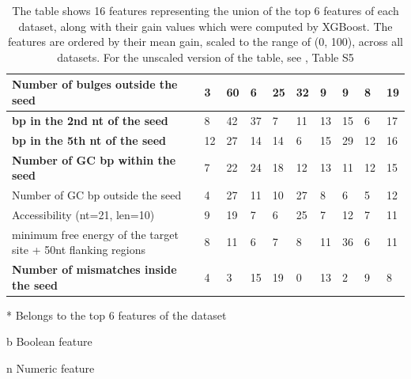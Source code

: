 \documentclass{bmcart}
\begin{document}
\begin{backmatter}
\begin{table}[h!]
\begin{threeparttable}
{\begin{tabular}{|l|l|l|l|l|l|l|l|l|l|}
Number of bulges outside the seed\tnote{n}                 & 3            & 60\tnote{*}           & 6            & 25\tnote{*}          & 32\tnote{*}          & 9           & 9           & 8           & 19            \\ \hline
\textbf{bp in the 2nd nt of the seed\tnote{b}}                    & 8            & 42           & 37\tnote{*}           & 7           & 11          & 13          & 15          & 6           & 17            \\ \hline
\textbf{bp in the 5th nt of the seed\tnote{b}}                    & 12           & 27           & 14           & 14          & 6           & 15          & 29\tnote{*}          & 12          & 16            \\ \hline
\textbf{Number of GC bp within the seed\tnote{n}}              & 7            & 22           & 24\tnote{*}           & 18\tnote{*}          & 12          & 13          & 11          & 12          & 15            \\ \hline
Number of GC bp outside the seed\tnote{n}                         & 4            & 27           & 11           & 10          & 27\tnote{*}          & 8           & 6           & 5           & 12            \\ \hline
Accessibility (nt=21, len=10)\tnote{n}                                    & 9            & 19           & 7            & 6           & 25          & 7           & 12          & 7           & 11            \\ \hline
minimum free energy of the target site + 50nt flanking regions\tnote{n}            & 8            & 11           & 6            & 7           & 8           & 11          & 36\tnote{*}          & 6           & 11            \\ \hline
\textbf{Number of mismatches inside the seed\tnote{n}}    & 4            & 3            & 15           & 19\tnote{*}          & 0           & 13          & 2           & 9           & 8             \\ \hline
\end{tabular}}
\begin{tablenotes}\footnotesize
\item[*] Belongs to the top 6 features of the dataset
\item[b] Boolean feature
\item[n] Numeric feature

\end{tablenotes}
 \end{threeparttable}
 \caption*{The table shows 16 features representing the union of the top 6 features of each dataset, along with their gain values which were computed by XGBoost. The features are ordered by their mean gain, scaled to the range of (0, 100), across all datasets. For the unscaled version of the table, see , Table S5}
\end{table}


\end{backmatter}
\end{document}
